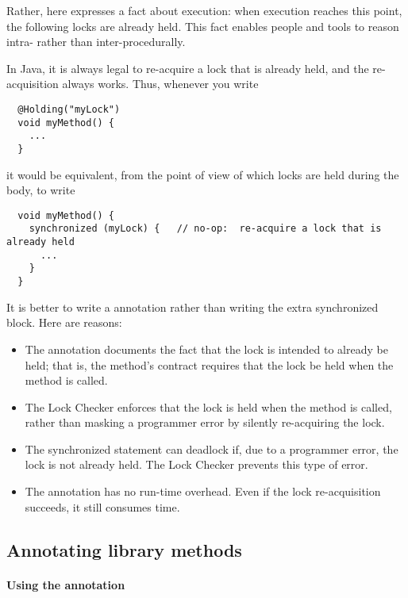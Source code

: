   Rather, here  expresses a fact about execution:  when
  execution reaches this point, the following locks are already held.  This
  fact enables people and tools to reason intra- rather than
  inter-procedurally.

  In Java, it is always legal to re-acquire a lock that is already held,
  and the re-acquisition always works.  Thus, whenever you write

\begin{Verbatim}
  @Holding("myLock")
  void myMethod() {
    ...
  }
\end{Verbatim}

\noindent
it would be equivalent, from the point of view of which locks are held
during the body, to write

\begin{Verbatim}
  void myMethod() {
    synchronized (myLock) {   // no-op:  re-acquire a lock that is already held
      ...
    }
  }
\end{Verbatim}


It is better to write a  annotation rather than writing the
extra synchronized block.  Here are reasons:

\begin{itemize}
\item
  The annotation documents the fact that the lock is intended to already be
  held;  that is, the method's contract requires that the lock be held when
  the method is called.
\item
  The Lock Checker enforces that the lock is held when the method is
  called, rather than masking a programmer error by silently re-acquiring
  the lock.
\item
  The synchronized statement can deadlock if, due to a programmer error,
  the lock is not already held.  The Lock Checker prevents this type of
  error.
\item
  The annotation has no run-time overhead.  Even if the lock re-acquisition
  succeeds, it still consumes time.
\end{itemize}


\subsection{Annotating library methods\label{lock-checker-library-methods}}

\paragraph{Using the  annotation\label{lock-checker-library-methods-nonleakedunknownguard}}

